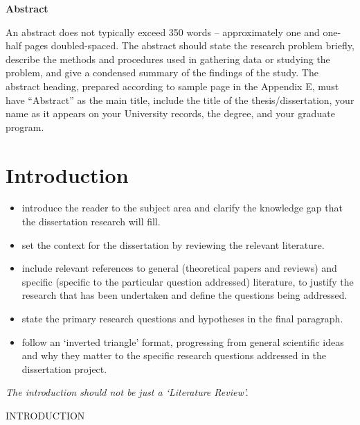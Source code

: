\documentclass[
  11pt,
]{article}
\providecommand{\tightlist}{%
  \setlength{\itemsep}{0pt}\setlength{\parskip}{0pt}}
\begin{document}
\begin{centering}
\begin{centering}
{\bf Abstract}
\end{centering}

An abstract does not typically exceed 350 words -- approximately one and
one-half pages doubled-spaced. The abstract should state the research
problem briefly, describe the methods and procedures used in gathering
data or studying the problem, and give a condensed summary of the
findings of the study. The abstract heading, prepared according to
sample page in the Appendix E, must have ``Abstract'' as the main title,
include the title of the thesis/dissertation, your name as it appears on
your University records, the degree, and your graduate program. \newpage

\hypertarget{introduction}{%
\section{Introduction}\label{introduction}}

\begin{itemize}
\tightlist
\item
  introduce the reader to the subject area and clarify the knowledge gap
  that the dissertation research will fill.
\item
  set the context for the dissertation by reviewing the relevant
  literature.
\item
  include relevant references to general (theoretical papers and
  reviews) and specific (specific to the particular question addressed)
  literature, to justify the research that has been undertaken and
  define the questions being addressed.
\item
  state the primary research questions and hypotheses in the final
  paragraph.
\item
  follow an `inverted triangle' format, progressing from general
  scientific ideas and why they matter to the specific research
  questions addressed in the dissertation project.
\end{itemize}

\emph{The introduction should not be just a `Literature Review'.}

\begin{centering}
INTRODUCTION
\end{centering}


\end{centering}
\end{document}
